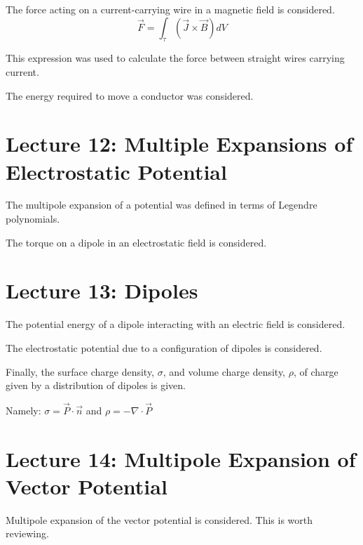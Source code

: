 \documentclass{article}
\begin{document}
The force acting on a current-carrying wire in a magnetic field is considered.
\[ 
        \vec{F} = \int_{\tau} \left( \vec{J} \times \vec{B} \right) dV
\]

This expression was used to calculate the force between straight wires carrying
current.

The energy required to move a conductor was considered.

\section*{Lecture 12: Multiple Expansions of Electrostatic Potential}

The multipole expansion of a potential was defined in terms of Legendre
polynomials.

The torque on a dipole in an electrostatic field is considered.

\section*{Lecture 13: Dipoles}
The potential energy of a dipole interacting with an electric field is
considered. 

The electrostatic potential due to a configuration of dipoles is considered.

Finally, the surface charge density, $\sigma$, and volume charge density,
$\rho$, of charge given by a distribution of dipoles is given.

Namely: $ \sigma = \vec{P}\cdot \vec{n} $ and $ \rho = -\nabla \cdot \vec{P} $ 

\section*{Lecture 14: Multipole Expansion of Vector Potential}
Multipole expansion of the vector potential is considered. This is worth
reviewing.
\end{document}
